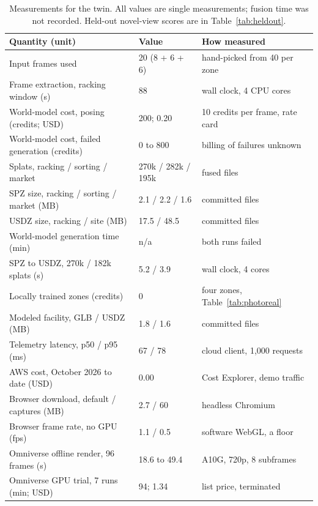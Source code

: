 \documentclass{article}
\begin{document}
\begin{table}[t]
\caption{Measurements for the twin. All values are single measurements; fusion time was not recorded. Held-out novel-view scores are in Table~\ref{tab:heldout}.}
\centering\small
\begin{tabular}{@{}lll@{}}
\toprule
Quantity (unit) & Value & How measured \\
\midrule
Input frames used & 20 (8 + 6 + 6) & hand-picked from 40 per zone \\
Frame extraction, racking window (s) & 88 & wall clock, 4 CPU cores \\
World-model cost, posing (credits; USD) & 200; 0.20 & 10 credits per frame, rate card \\
World-model cost, failed generation (credits) & 0 to 800 & billing of failures unknown \\
Splats, racking / sorting / market & 270k / 282k / 195k & fused files \\
SPZ size, racking / sorting / market (MB) & 2.1 / 2.2 / 1.6 & committed files \\
USDZ size, racking / site (MB) & 17.5 / 48.5 & committed files \\
World-model generation time (min) & n/a & both runs failed \\
SPZ to USDZ, 270k / 182k splats (s) & 5.2 / 3.9 & wall clock, 4 cores \\
Locally trained zones (credits) & 0 & four zones, Table~\ref{tab:photoreal} \\
Modeled facility, GLB / USDZ (MB) & 1.8 / 1.6 & committed files \\
Telemetry latency, p50 / p95 (ms) & 67 / 78 & cloud client, 1{,}000 requests \\
AWS cost, October 2026 to date (USD) & 0.00 & Cost Explorer, demo traffic \\
Browser download, default / captures (MB) & 2.7 / 60 & headless Chromium \\
Browser frame rate, no GPU (fps) & 1.1 / 0.5 & software WebGL, a floor \\
Omniverse offline render, 96 frames (s) & 18.6 to 49.4 & A10G, 720p, 8 subframes \\
Omniverse GPU trial, 7 runs (min; USD) & 94; 1.34 & list price, terminated \\
\bottomrule
\end{tabular}
\label{tab:results}
\end{table}
\end{document}
